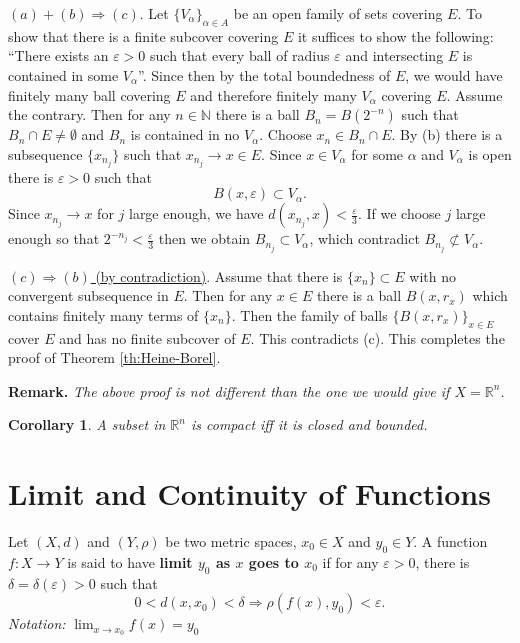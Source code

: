 \documentclass[12pt]{report}
\newtheorem{corollary}[theorem]{Corollary}
\begin{document}
\medskip
\noindent
\underline{$(a) +(b) \Longrightarrow (c)$}.  Let $\{V_\alpha\}_{\alpha
\in A}$ be an open family of sets covering $E$.  To show that there is
a finite subcover covering $E$ it suffices to show the following:
``There exists an $\varepsilon > 0 $ such that every ball of radius
$\varepsilon$ and intersecting $E$ is contained in some $V_\alpha$''. 
Since then by the total boundedness of $E$, we would have finitely
many ball covering $E$ and therefore finitely  many $V_\alpha$
covering $E$.  Assume the contrary.  Then for any $n \in \mathbb{N}$
there is a ball $B_n = B(2^{-n})$ such that
$B_n \cap E \ne
\emptyset$ and $B_n$ is contained in no $V_\alpha$.  Choose $x_n \in
B_n \cap E$.  By (b)  there is a subsequence
$\{x_{n_j}\}$ such that $x_{n_j}
\longrightarrow x \in E$.  Since $x \in V_\alpha $ for some $\alpha$
and $V_\alpha$ is open there is $\varepsilon > 0$ such that
\[ B(x, \varepsilon) \subset V_\alpha.
\] Since $x_{n_j} \to x$ for $j$ large enough, we have $d(x_{n_j}, x) <
\frac{\varepsilon}{3}$.  If we choose $j$ large enough so that $2^{-n_j}
<
\frac{\varepsilon}{3}$ then we obtain $B_{n_j} \subset V_\alpha$,
which contradict
$B_{n_j} \not\subset V_\alpha$.

\medskip
\noindent
\underline{$(c) \Longrightarrow (b)$ (by contradiction)}.  Assume
that there is $\{x_n\}
\subset E$ with no convergent subsequence in $E$.  Then for any $x
\in E$ there is a ball $B(x, r_x)$ which contains finitely many terms of
$\{x_n\}$.  Then the family of balls
$\{B(x, r_x) \}_{x \in E}$ cover $E$ and has no finite  subcover of $E$. 
This contradicts (c).
 This completes the proof of Theorem \ref{th:Heine-Borel}.


\medskip
\noindent
\textbf{Remark.} \textit{ The above proof is not different than the
one we would give if $ X =
\mathbb{R}^n$.}

\begin{corollary}
\label{cor:Heine-Borel}
 A subset in $\mathbb{R}^n$ is compact iff
it is closed and bounded.
\end{corollary}

\section{Limit and Continuity of Functions}
 Let $(X, d)$ and $(Y, \rho)$ be two metric spaces, $ x_0 \in
X$ and $y_0 \in Y$.  A function $f: X \longrightarrow Y$ is said to have
{\bf limit $y_0$ as $x$ goes to $x_0$} if for any $\varepsilon > 0$,
there is $\delta = \delta (\varepsilon) > 0 $  such that
\[ 0 < d (x, x_0) < \delta \Longrightarrow \rho(f(x),y_0) <
\varepsilon.
\]
\textit{Notation:}  $\displaystyle{\lim_{x\to x_0} f(x) = y_0}$
\end{document}
